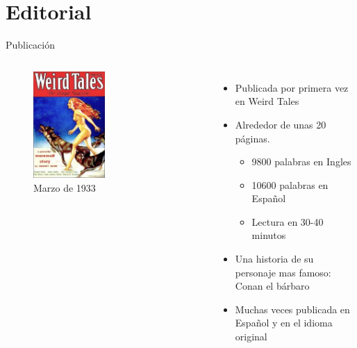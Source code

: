 \section{Editorial}
\begin{frame}{Publicación}
\begin{columns}
    \begin{figure}[htb]
    \centering
        \includegraphics[width=0.5\textwidth]{img/WeirdTales-1933-03}
        \caption{Marzo de 1933}
    \end{figure}    
    \begin{itemize}
         \item Publicada por primera vez en Weird Tales
         \item Alrededor de unas 20 páginas.
         \begin{itemize}
            \item 9800 palabras en Ingles
            \item 10600 palabras en Español
            \item Lectura en 30-40 minutos
         \end{itemize}
         \item Una historia de su personaje mas famoso: Conan el bárbaro
         \item Muchas veces publicada en Español y en el idioma original
    \end{itemize}
\end{columns}
\end{frame}

